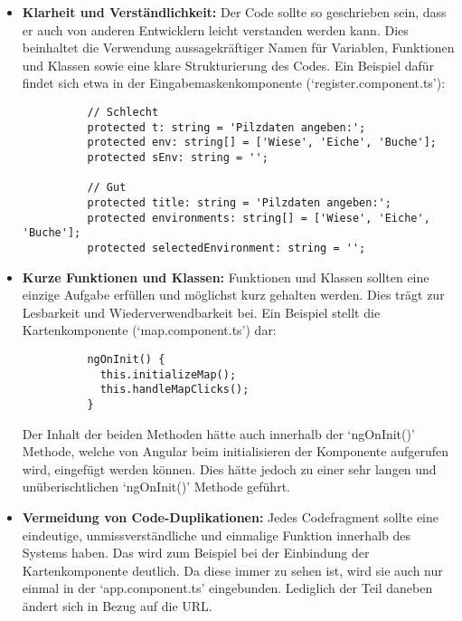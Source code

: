 \documentclass[../main.tex]{subfiles} %
\begin{document}
\begin{itemize}

	\item \textbf{Klarheit und Verständlichkeit:}
	      Der Code sollte so geschrieben sein, dass er auch von anderen Entwicklern leicht verstanden werden kann. Dies beinhaltet die Verwendung aussagekräftiger
	      Namen für Variablen, Funktionen und Klassen sowie eine klare Strukturierung des Codes. Ein Beispiel dafür findet sich etwa in der Eingabemaskenkomponente
	      (`register.component.ts'):

	      \begin{verbatim}
          // Schlecht
          protected t: string = 'Pilzdaten angeben:';
          protected env: string[] = ['Wiese', 'Eiche', 'Buche'];
          protected sEnv: string = '';

          // Gut
          protected title: string = 'Pilzdaten angeben:';
          protected environments: string[] = ['Wiese', 'Eiche', 'Buche'];
          protected selectedEnvironment: string = '';
        \end{verbatim}

	\item \textbf{Kurze Funktionen und Klassen:}
	      Funktionen und Klassen sollten eine einzige Aufgabe erfüllen und möglichst kurz gehalten werden. Dies trägt zur Lesbarkeit und Wiederverwendbarkeit bei.
	      Ein Beispiel stellt die Kartenkomponente (`map.component.ts') dar:

	      \begin{verbatim}
          ngOnInit() {
            this.initializeMap();
            this.handleMapClicks();
          }
        \end{verbatim}

	      Der Inhalt der beiden Methoden hätte auch innerhalb der `ngOnInit()' Methode, welche von Angular beim initialisieren der Komponente aufgerufen wird,
	      eingefügt werden können. Dies hätte jedoch zu einer sehr langen und unüberischtlichen `ngOnInit()' Methode geführt.

	\item \textbf{Vermeidung von Code-Duplikationen:}
	      Jedes Codefragment sollte eine eindeutige, unmissverständliche und einmalige Funktion innerhalb des Systems haben. Das wird zum Beispiel bei der Einbindung
	      der Kartenkomponente deutlich. Da diese immer zu sehen ist, wird sie auch nur einmal in der `app.component.ts' eingebunden. Lediglich der Teil daneben ändert
	      sich in Bezug auf die URL.


\end{itemize}
\end{document}
